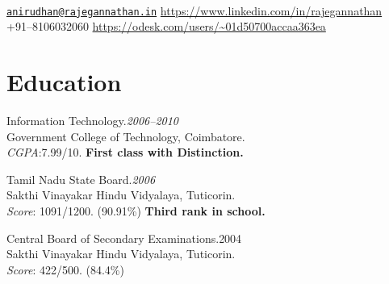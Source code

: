 \documentclass{cv}
\begin{document}
\\
{\href{mailto:anirudhan@rajegannathan.in}{\nolinkurl{anirudhan@rajegannathan.in}} \hfill \url{https://www.linkedin.com/in/rajegannathan}}\\
{+91--8106032060 \hfill \url{https://odesk.com/users/~01d50700accaa363ea}}
 
\section{Education}
\begin{description}[leftmargin=55pt,labelwidth=50pt]
  \item[B.Tech] Information Technology.\hfill\textit{2006--2010}
    \\Government College of Technology, Coimbatore.
    \\\textit{CGPA}:7.99/10.  \textbf{First class with Distinction.}
  \item[HSC] Tamil Nadu State Board.\hfill\textit{2006}
    \\Sakthi Vinayakar Hindu Vidyalaya, Tuticorin.
    \\\textit{Score}: 1091/1200. (90.91\%) \textbf{Third rank in school.}
  \item[AISSE] Central Board of Secondary Examinations.\hfill{2004}
    \\Sakthi Vinayakar Hindu Vidyalaya, Tuticorin.
    \\\textit{Score}: 422/500. (84.4\%)
\end{description}
 
\end{document}
